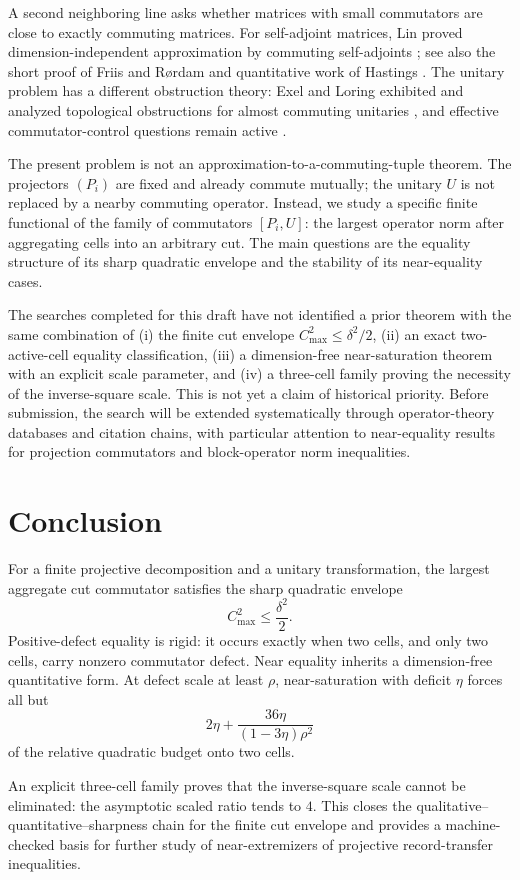 \documentclass[11pt]{article}
\newcommand{\cmax}{C_{\max}}
\newcommand{\dd}{\delta}
\newcommand{\etaq}{\eta}
\begin{document}
A second neighboring line asks whether matrices with small commutators are
close to exactly commuting matrices.  For self-adjoint matrices, Lin proved
dimension-independent approximation by commuting self-adjoints
\cite{Lin1997AlmostCommuting}; see also the short proof of Friis and R{\o}rdam
\cite{FriisRordam1996} and quantitative work of Hastings
\cite{Hastings2009}.  The unitary problem has a different obstruction theory:
Exel and Loring exhibited and analyzed topological obstructions for almost
commuting unitaries \cite{ExelLoring1989,ExelLoring1991}, and effective
commutator-control questions remain active
\cite{DorOnHallKachkovskiy2025}.

The present problem is not an approximation-to-a-commuting-tuple theorem.
The projectors $(P_i)$ are fixed and already commute mutually; the unitary
$U$ is not replaced by a nearby commuting operator.  Instead, we study a
specific finite functional of the family of commutators $[P_i,U]$: the
largest operator norm after aggregating cells into an arbitrary cut.  The
main questions are the equality structure of its sharp quadratic envelope
and the stability of its near-equality cases.

The searches completed for this draft have not identified a prior theorem
with the same combination of (i) the finite cut envelope
$\cmax^2\le\dd^2/2$, (ii) an exact two-active-cell equality classification,
(iii) a dimension-free near-saturation theorem with an explicit scale
parameter, and (iv) a three-cell family proving the necessity of the
inverse-square scale.  This is not yet a claim of historical priority.
Before submission, the search will be extended systematically through
operator-theory databases and citation chains, with particular attention to
near-equality results for projection commutators and block-operator norm
inequalities.

\section{Conclusion}

For a finite projective decomposition and a unitary transformation, the
largest aggregate cut commutator satisfies the sharp quadratic envelope
\[
  \cmax^2\le\frac{\dd^2}{2}.
\]
Positive-defect equality is rigid: it occurs exactly when two cells, and only
two cells, carry nonzero commutator defect.  Near equality inherits a
dimension-free quantitative form.  At defect scale at least $\rho$,
near-saturation with deficit $\etaq$ forces all but
\[
  2\etaq+
  \frac{36\etaq}{(1-3\etaq)\rho^2}
\]
of the relative quadratic budget onto two cells.

An explicit three-cell family proves that the inverse-square scale cannot be
eliminated: the asymptotic scaled ratio tends to $4$.  This closes the
qualitative--quantitative--sharpness chain for the finite cut envelope and
provides a machine-checked basis for further study of near-extremizers of
projective record-transfer inequalities.



\end{document}
